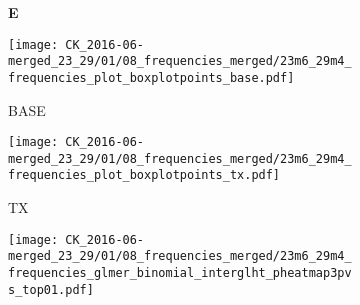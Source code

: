 \documentclass[a4paper, 12pt]{article}
\begin{document}
\begin{figure}[!thb]
\centering

    \caption{Immune cell frequencies}
    \begin{subfigure}[t]{0.02\textwidth}
    \vskip 0pt
        \textbf{\textsf{\normalsize E}}
    \end{subfigure}
    \begin{subfigure}[t]{0.45\textwidth}
    \vskip 0pt
    \caption{BASE}
        \texttt{[image: CK\_2016-06-merged\_23\_29/01/08\_frequencies\_merged/23m6\_29m4\_frequencies\_plot\_boxplotpoints\_base.pdf]}
    \end{subfigure}
    \quad
        \begin{subfigure}[t]{0.02\textwidth}
    \vskip 0pt
        \textbf{\textsf{\normalsize }}
    \end{subfigure}
    \begin{subfigure}[t]{0.45\textwidth}
    \vskip 0pt
    \caption{TX}
        \texttt{[image: CK\_2016-06-merged\_23\_29/01/08\_frequencies\_merged/23m6\_29m4\_frequencies\_plot\_boxplotpoints\_tx.pdf]}
    \end{subfigure}
        
    \begin{subfigure}[t]{0.02\textwidth}
    \vskip 0pt
        \textbf{\textsf{\normalsize}}
    \end{subfigure}
    \begin{subfigure}[t]{0.45\textwidth}
    \vskip 0pt
    \caption{}
        \texttt{[image: CK\_2016-06-merged\_23\_29/01/08\_frequencies\_merged/23m6\_29m4\_frequencies\_glmer\_binomial\_interglht\_pheatmap3pvs\_top01.pdf]}
    \end{subfigure}
    
    
\end{figure}
\end{document}
